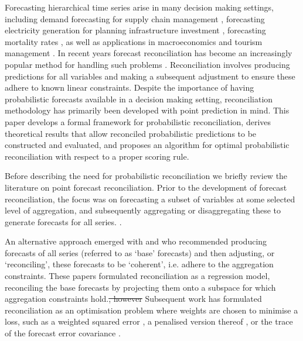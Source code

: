 \documentclass[a4paper,12pt]{article}
\theoremstyle{definition}
\begin{document}
Forecasting hierarchical time series arise in many decision making settings, including demand forecasting for supply chain management \textcolor{red}{\citep{BabEtAl2021, KouAth2021}}, forecasting electricity generation for planning infrastructure investment \textcolor{red}{\citep{Taieb2017, nystrup2020}}, forecasting mortality rates \textcolor{red}{\citep{LiHyn2021}}, as well as applications in macroeconomics \textcolor{red}{\citep{EckEtAl2021, AthEtAl2020_MacroBook}} and tourism management \textcolor{red}{\citep{AthEtAl2022, KouAth2019}}. In recent years forecast reconciliation has become an increasingly popular method for handling such problems \citep[see][for an overview]{FPP2018}. Reconciliation involves producing predictions for all variables and making a subsequent adjustment to ensure these adhere to known linear constraints. Despite the importance of having probabilistic forecasts available in a decision making setting, reconciliation methodology has primarily been developed with point prediction in mind. This paper develops a formal framework for probabilistic reconciliation, derives theoretical results that allow reconciled probabilistic predictions to be constructed and evaluated, and proposes an algorithm for optimal probabilistic reconciliation with respect to a proper scoring rule.

Before describing the need for probabilistic reconciliation we briefly review the literature on point forecast reconciliation. {\color{red} Prior to the development of forecast reconciliation, the focus was on forecasting a subset of variables at some selected level of aggregation, and subsequently aggregating or disaggregating these to generate forecasts for all series. \citep[see][and references therein]{Dunn1976,Gross1990}.}

An alternative approach emerged with \cite{AthEtAl2009} and \cite{HynEtAl2011} who recommended producing forecasts of all series (referred to as `base' forecasts) and then adjusting, or `reconciling', these forecasts to be `coherent', i.e. adhere to the aggregation constraints. These papers formulated reconciliation as a regression model{\color{red}, reconciling the base forecasts by projecting them onto a subspace for which aggregation constraints hold.}\sout{, however} Subsequent work has formulated reconciliation as an optimisation problem where weights are chosen to minimise a loss, such as a weighted squared error \citep{VanErven2015a,nystrup2020}, a penalised version thereof \citep{bentaiebkoo}, or the trace of the forecast error covariance \citep{WicEtAl2019}.
\end{document}
